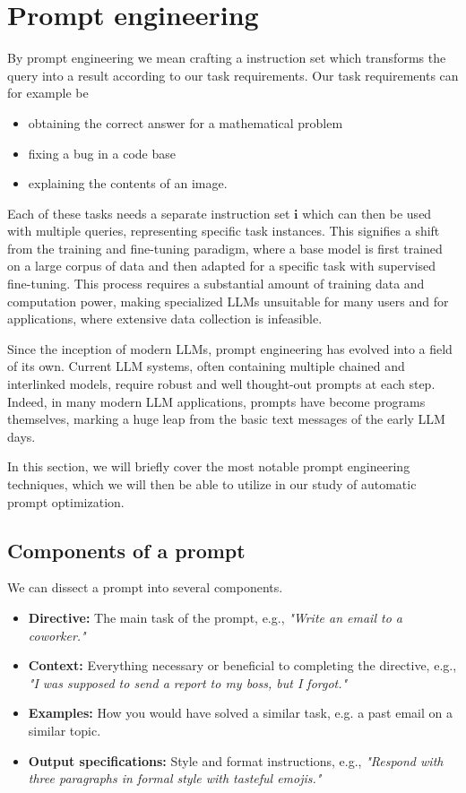 \section{Prompt engineering}\label{sec:preng}
By prompt engineering we mean crafting a instruction set which 
transforms the query into a result according to our task requirements.
Our task requirements can for example be
\begin{itemize}
    \item obtaining the correct answer for a mathematical problem
    \item fixing a bug in a code base
    \item explaining the contents of an image.
\end{itemize}
Each of these tasks needs a separate instruction set $\mathbf{i}$ which can then be used with multiple queries,
representing specific task instances. This signifies a shift from the training and fine-tuning paradigm, where 
a base model is first trained on a large corpus of data and then adapted for a specific task with supervised fine-tuning.
This process requires a substantial amount of training data and computation power, making specialized LLMs unsuitable
for many users and for applications, where extensive data collection is infeasible.


Since the inception of modern LLMs, prompt engineering has evolved into a field of its own. Current LLM systems, often containing
multiple chained and interlinked models, require robust and well thought-out prompts at each step. 
Indeed, in many modern LLM applications, prompts have become programs themselves\cite{schnabel2024symbolicpromptprogramsearch}, 
marking a huge leap from the basic text messages of the early LLM days.

In this section, we will briefly cover the most notable prompt engineering techniques, which we will then
be able to utilize in our study of automatic prompt optimization.
\newpage
\subsection{Components of a prompt}
We can dissect a prompt into several components\cite{schulhoff2024promptreportsystematicsurvey}.
\begin{itemize}
    \item \textbf{Directive:} The main task of the prompt, e.g., \textit{"Write an email to a coworker."}
    \item \textbf{Context:} Everything necessary or beneficial to completing the directive, e.g., \textit{"I was supposed to send a report to my boss, but I forgot."}
    \item \textbf{Examples:} How you would have solved a similar task, e.g. a past email on a similar topic.
    \item \textbf{Output specifications:} Style and format instructions, e.g., \textit{"Respond with three paragraphs in formal style with tasteful emojis."}
\end{itemize}

